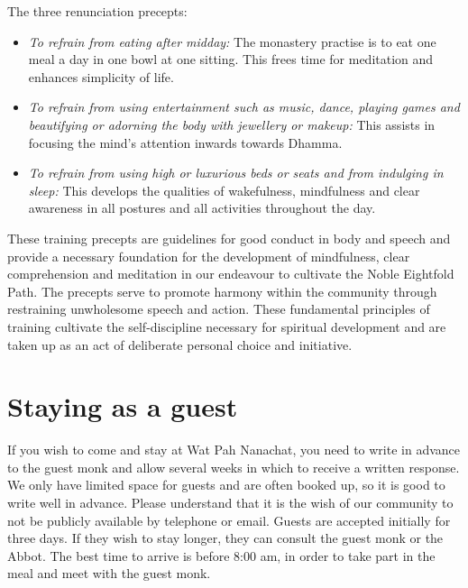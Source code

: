 The three renunciation precepts:

\begin{itemize}

  \item \emph{To refrain from eating after midday:} The monastery practise is
    to eat one meal a day in one bowl at one sitting. This frees time
    for meditation and enhances simplicity of life.

  \item \emph{To refrain from using entertainment such as music, dance,
    playing games and beautifying or adorning the body with jewellery or
  makeup:} This assists in focusing the mind's attention inwards towards
  Dhamma.

  \item \emph{To refrain from using high or luxurious beds or seats and from
    indulging in sleep:} This develops the qualities of wakefulness,
    mindfulness and clear awareness in all postures and all activities
    throughout the day.

\end{itemize}

These training precepts are guidelines for good conduct in body and
speech and provide a necessary foundation for the development of
mindfulness, clear comprehension and meditation in our endeavour to
cultivate the Noble Eightfold Path. The precepts serve to promote
harmony within the community through restraining unwholesome speech and
action. These fundamental principles of training cultivate the
self-discipline necessary for spiritual development and are taken up as
an act of deliberate personal choice and initiative.

\section{Staying as a guest}

If you wish to come and stay at Wat Pah Nanachat, you need to write in
advance to the guest monk and allow several weeks in which to receive a
written response. We only have limited space for guests and are often
booked up, so it is good to write well in advance. Please understand
that it is the wish of our community to not be publicly available by
telephone or email. Guests are accepted initially for three days. If
they wish to stay longer, they can consult the guest monk or the Abbot.
The best time to arrive is before 8:00 am, in order to take part in the
meal and meet with the guest monk.

